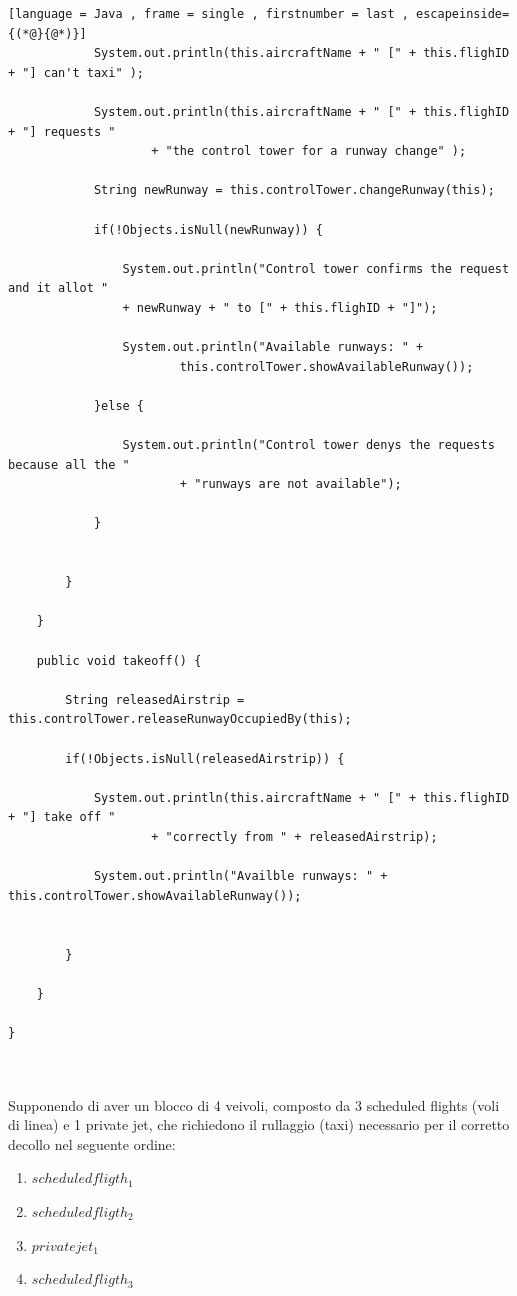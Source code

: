 \documentclass{article}
\begin{document}
\begin{sloppy}
\begin{lstlisting}[language = Java , frame = single , firstnumber = last , escapeinside={(*@}{@*)}]
			System.out.println(this.aircraftName + " [" + this.flighID + "] can't taxi" );
			
			System.out.println(this.aircraftName + " [" + this.flighID + "] requests "
					+ "the control tower for a runway change" );
			
			String newRunway = this.controlTower.changeRunway(this);
			
			if(!Objects.isNull(newRunway)) {
				
				System.out.println("Control tower confirms the request and it allot " 
				+ newRunway + " to [" + this.flighID + "]");
				
				System.out.println("Available runways: " + 
						this.controlTower.showAvailableRunway());
				
			}else {
				
				System.out.println("Control tower denys the requests because all the "
						+ "runways are not available");
				
			}
			

		}
		
    }

    public void takeoff() {
		
		String releasedAirstrip = this.controlTower.releaseRunwayOccupiedBy(this);
		
		if(!Objects.isNull(releasedAirstrip)) {
			
			System.out.println(this.aircraftName + " [" + this.flighID + "] take off "
					+ "correctly from " + releasedAirstrip);
			
			System.out.println("Availble runways: " + this.controlTower.showAvailableRunway());
			
			
		}
		
    }
   
}



\end{lstlisting}

\bigbreak

Supponendo di aver un blocco di 4 veivoli, composto da 3 scheduled flights (voli di linea) e 1 private jet, che richiedono il rullaggio (taxi) necessario per il corretto decollo nel seguente ordine:
\begin{enumerate}
    \item $scheduled fligth_1$
    \item $scheduled fligth_2$
    \item $private jet_1$
    \item $scheduled fligth_3$
\end{enumerate}


\end{sloppy}
\end{document}
